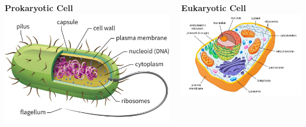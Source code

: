 \documentclass[10pt]{beamer}
\begin{document}
\begin{frame}
	\begin{columns}
		\begin{column}{0.5\textwidth}
			\begin{center}
				\textbf{Prokaryotic Cell}\\
				\vspace{0.5cm}
				\includegraphics[width=1.0\textwidth]{figures/bacteria_cell.jpg}
			\end{center}
		\end{column}
		
		\begin{column}{0.5\textwidth}
			\begin{center}
				\textbf{Eukaryotic Cell}\\
				\vspace{0.5cm}
				\includegraphics[width=1.0\textwidth]{figures/animal.jpg}
			\end{center}
		\end{column}
	\end{columns}
\end{frame}
\end{document}
